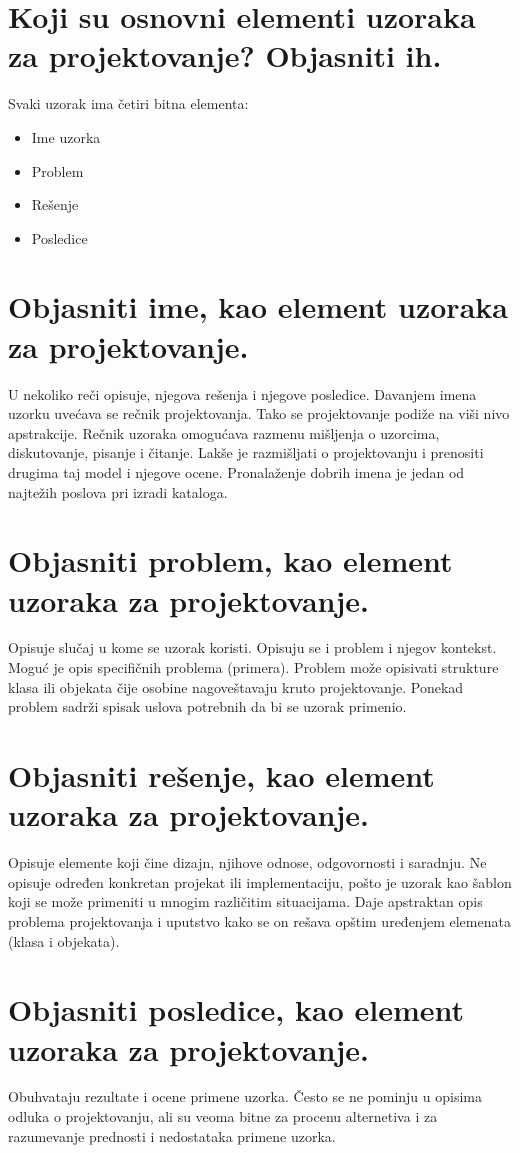 \documentclass[a4paper]{article}
\begin{document}
\section{Koji su osnovni elementi uzoraka za projektovanje? Objasniti ih.}
  Svaki uzorak ima četiri bitna elementa:
  \begin{itemize}
    \item Ime uzorka
    \item Problem
    \item Rešenje
    \item Posledice
  \end{itemize}

\section{Objasniti ime, kao element uzoraka za projektovanje.}
  U nekoliko reči opisuje, njegova rešenja i njegove posledice.
  Davanjem imena uzorku uvećava se rečnik projektovanja.
  Tako se projektovanje podiže na viši nivo apstrakcije.
  Rečnik uzoraka omogućava razmenu mišljenja o uzorcima, diskutovanje, pisanje i čitanje.
  Lakše je razmišljati o projektovanju i prenositi drugima taj model i njegove ocene.
  Pronalaženje dobrih imena je jedan od najtežih poslova pri izradi kataloga.

\section{Objasniti problem, kao element uzoraka za projektovanje.}
  Opisuje slučaj u kome se uzorak koristi.
  Opisuju se i problem i njegov kontekst.
  Moguć je opis specifičnih problema (primera).
  Problem može opisivati strukture klasa ili objekata čije osobine nagoveštavaju kruto 
  projektovanje. Ponekad problem sadrži spisak uslova potrebnih da bi se uzorak primenio.

\section{Objasniti rešenje, kao element uzoraka za projektovanje.}
  Opisuje elemente koji čine dizajn, njihove odnose, odgovornosti i saradnju.
  Ne opisuje određen konkretan projekat ili implementaciju, 
  pošto je uzorak kao šablon koji se može primeniti u mnogim različitim situacijama.
  Daje apstraktan opis problema projektovanja i uputstvo kako se on rešava opštim uređenjem 
  elemenata (klasa i objekata).

\section{Objasniti posledice, kao element uzoraka za projektovanje.}
  Obuhvataju rezultate i ocene primene uzorka.
  Često se ne pominju u opisima odluka o projektovanju, 
  ali su veoma bitne za procenu alternetiva i za razumevanje prednosti 
  i nedostataka primene uzorka.
\end{document}
